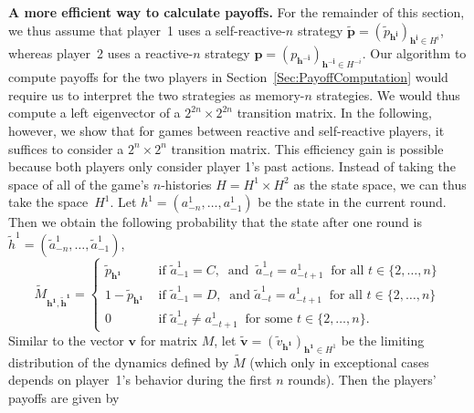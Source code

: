 \documentclass[9pt,twoside,lineno]{pnas-new}
\theoremstyle{plainCl1}
\theoremstyle{plainCl2}
\begin{document}
\noindent
{\bf A more efficient way to calculate payoffs.}
For the remainder of this section, we thus assume that player~1 uses a self-reactive-$n$ strategy $\mathbf{\tilde p}\!=\!(\tilde p_\mathbf{h^i})_{\mathbf{h^i}\in H^i}$, whereas player~2 uses a reactive-$n$ strategy $\mathbf{p}\!=\!(p_\mathbf{h^{-i}})_{\mathbf{h^{-i}}\in H^{-i}}$. 
Our algorithm to compute payoffs for the two players in Section~\ref{Sec:PayoffComputation} would require us to interpret the two strategies as memory-$n$ strategies. 
We would thus compute a left eigenvector of a $2^{2n}\!\times\!2^{2n}$ transition matrix. 
In the following, however, we show that for games between reactive and self-reactive players, it suffices to consider a $2^n\!\times\!2^n$ transition matrix.
This efficiency gain is possible because both players only consider player 1's past actions.  
Instead of taking the space of all of the game's $n$-histories $H\!=\!H^1\!\times\! H^2$  as the state space, we can thus take the space~$H^1$. 
Let \(h^1=(a^1_{-n},\ldots,a^1_{-1})\) be the state in the current round. 
Then we obtain the following probability that the state after one round is  \(\tilde{h}^1=(\tilde{a}^1_{-n},\ldots,\tilde{a}^1_{-1})\),\begin{equation}\label{Eq:TransitionMatrixSelfReactive}
\tilde{M}_{\mathbf{h^1},\mathbf{ \tilde{h}^1}} = 
\begin{cases}
  \tilde{p}_\mathbf{h^1} & \text{ if } \tilde{a}^1_{-1}\! =\! C,~\text{ and }~\tilde{a}^1_{-t} \!=\! a^1_{-t + 1}~\text{ for all } t\!\in\!\{2,\ldots,n\}\\
  1 - \tilde{p}_\mathbf{h^1} & \text{ if } \tilde{a}^1_{-1}\!=\! D,~\text{ and } \tilde{a}^1_{-t} \!=\! a^1_{-t + 1}~\text{ for all } t\!\in\!\{2,\ldots,n\}\\
  0 & \text{ if } \tilde{a}^1_{-t} \!\neq\!  a^1_{-t + 1}~ \text{ for some } t\!\in\!\{2,\ldots,n\}.
\end{cases}
\end{equation}
Similar to the vector $\mathbf{v}$ for matrix $M$, let $\mathbf{\tilde{v}}\!=\!(\tilde{v}_\mathbf{h^1})_{\mathbf{h^1}\in H^1}$ be the limiting distribution of the dynamics defined by $\tilde M$ (which only in exceptional cases depends on player~1's behavior during the first $n$ rounds). Then the players' payoffs are given by
\end{document}
